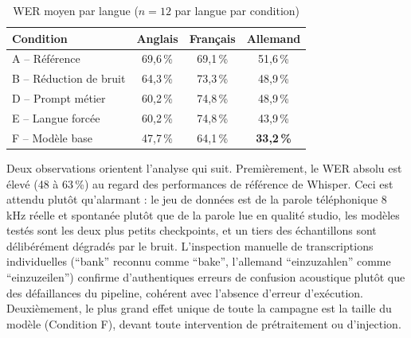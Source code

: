 \documentclass[12pt]{report}
\begin{document}
\begin{table}[H]
\centering
\begin{tabular}{|l|c|c|c|}
\hline
\textbf{Condition} & \textbf{Anglais} & \textbf{Français} & \textbf{Allemand} \\ \hline
A -- Référence & 69,6\,\% & 69,1\,\% & 51,6\,\% \\ \hline
B -- Réduction de bruit & 64,3\,\% & 73,3\,\% & 48,9\,\% \\ \hline
D -- Prompt métier & 60,2\,\% & 74,8\,\% & 48,9\,\% \\ \hline
E -- Langue forcée & 60,2\,\% & 74,8\,\% & 43,9\,\% \\ \hline
F -- Modèle base & 47,7\,\% & 64,1\,\% & \textbf{33,2\,\%} \\ \hline
\end{tabular}
\caption{WER moyen par langue ($n=12$ par langue par condition)}
\label{tab:results_lang}
\end{table}
Deux observations orientent l'analyse qui suit. Premièrement, le WER absolu est élevé (48 à 63\,\%) au regard des performances de référence de Whisper. Ceci est attendu plutôt qu'alarmant : le jeu de données est de la parole téléphonique 8\,kHz réelle et spontanée plutôt que de la parole lue en qualité studio, les modèles testés sont les deux plus petits checkpoints, et un tiers des échantillons sont délibérément dégradés par le bruit. L'inspection manuelle de transcriptions individuelles (\enquote{bank} reconnu comme \enquote{bake}, l'allemand \enquote{einzuzahlen} comme \enquote{einzuzeilen}) confirme d'authentiques erreurs de confusion acoustique plutôt que des défaillances du pipeline, cohérent avec l'absence d'erreur d'exécution. Deuxièmement, le plus grand effet unique de toute la campagne est la taille du modèle (Condition F), devant toute intervention de prétraitement ou d'injection.
\end{document}
